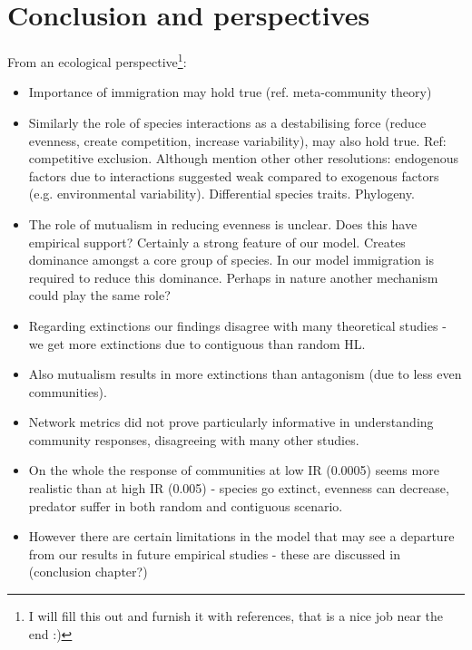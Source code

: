 \section{Conclusion and perspectives}
\label{sec:vir_conclusion}

From an ecological perspective\footnote{I will fill this out and furnish it with references, that is a nice job near the end :)}:
\begin{itemize}
	\item Importance of immigration may hold true (ref. meta-community theory)
	\item Similarly the role of species interactions as a destabilising force (reduce evenness, create competition, increase variability), may also hold true. Ref: competitive exclusion. Although mention other other resolutions: endogenous factors due to interactions suggested weak compared to exogenous factors (e.g. environmental variability). Differential species traits. Phylogeny.
	\item The role of mutualism in reducing evenness is unclear. Does this have empirical support? Certainly a strong feature of our model. Creates dominance amongst a core group of species. In our model immigration is required to reduce this dominance. Perhaps in nature another mechanism could play the same role?
	\item Regarding extinctions our findings disagree with many theoretical studies - we get more extinctions due to contiguous than random HL. 
	\item Also mutualism results in more extinctions than antagonism (due to less even communities).
	\item Network metrics did not prove particularly informative in understanding community responses, disagreeing with many other studies. 
	\item On the whole the response of communities at low IR (0.0005) seems more realistic than at high IR (0.005) - species go extinct, evenness can decrease, predator suffer in both random and contiguous scenario.
	\item However there are certain limitations in the model that may see a departure from our results in future empirical studies - these are discussed in (conclusion chapter?) 
\end{itemize}

